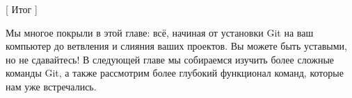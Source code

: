 [ Итог ]

Мы многое покрыли в этой главе: всё, начиная от установки Git на ваш компьютер до 
ветвления и слияния ваших проектов. Вы можете быть уставыми, но не сдавайтесь! В
следующей главе мы собираемся изучить более сложные команды Git, а также рассмотрим
более глубокий функционал команд, которые нам уже встречались.
